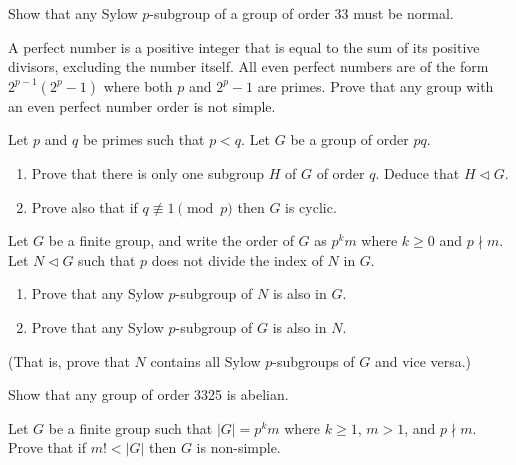 \begin{problem}
    Show that any Sylow $p$-subgroup of a group of order 33 must be normal.
\end{problem}

\begin{problem}
    A perfect number is a positive integer that is equal to the sum of its positive divisors, excluding the number itself. All even perfect numbers are of the form $2^{p-1}\left(2^p-1\right)$ where both $p$ and $2^p-1$ are primes. Prove that any group with an even perfect number order is not simple.
\end{problem}

\begin{problem}\label{problem-group-of-order-pq-has-normal-subgroup-of-order-q}
    Let $p$ and $q$ be primes such that $p < q$. Let $G$ be a group of order $pq$.
    \begin{enumerate}[label=(\roman*)]
        \item Prove that there is only one subgroup $H$ of $G$ of order $q$. Deduce that $H \lhd G$.
        \item Prove also that if $q \not\equiv 1 \pmod p$ then $G$ is cyclic.
    \end{enumerate}
\end{problem}

\begin{problem}\label{problem-normal-subgroup-of-G-contains-all-sylow-p-subgroups}
    Let $G$ be a finite group, and write the order of $G$ as $p^km$ where $k \geq 0$ and $p \nmid m$. Let $N \lhd G$ such that $p$ does not divide the index of $N$ in $G$.
    \begin{enumerate}[label=(\roman*)]
        \item Prove that any Sylow $p$-subgroup of $N$ is also in $G$.
        \item Prove that any Sylow $p$-subgroup of $G$ is also in $N$.
    \end{enumerate}
    (That is, prove that $N$ contains all Sylow $p$-subgroups of $G$ and vice versa.)
\end{problem}

\begin{problem}
    Show that any group of order 3325 is abelian.
\end{problem}

\begin{problem}\label{problem-if-m!<|G|-then-G-is-simple}
    Let $G$ be a finite group such that $|G| = p^km$ where $k \geq 1$, $m > 1$, and $p \nmid m$. Prove that if $m! < |G|$ then $G$ is non-simple.
\end{problem}

